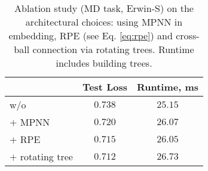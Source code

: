 \begin{table}
\vspace{-5pt}
\caption{Ablation study (MD task, Erwin-S) on the architectural choices: using MPNN in embedding, RPE (see Eq. \ref{eq:rpe}) and cross-ball connection via rotating trees. Runtime includes building trees.}
\label{table:ablation_arch}
\begin{center}
\begin{small}
\begin{sc}
\begin{tabular}{lcc}
\toprule
& Test Loss & Runtime, ms \\
\midrule
w/o & $0.738$ & $25.15$ \\
\quad $+$ MPNN & $0.720$ & $26.07$ \\
\quad $+$ RPE & $0.715$ & $26.05$ \\
\quad $+$ rotating tree & $0.712$ & $26.73$ \\
\bottomrule
\end{tabular}
\vspace{-10pt}
\end{sc}
\end{small}
\end{center}
\end{table}